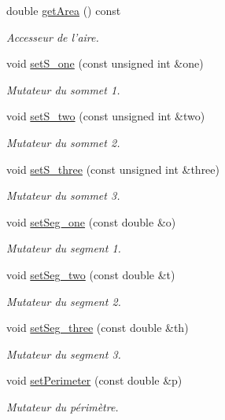 \begin{DoxyCompactItemize}
double \hyperlink{class_face_a58beb8ce1b9f8154379db998a02ffa3d}{get\-Area} () const 
\begin{DoxyCompactList}\small\item\em Accesseur de l'aire. \end{DoxyCompactList}\item 
void \hyperlink{class_face_a96639aea98e0c24899d892bec1d5f513}{set\-S\-\_\-one} (const unsigned int \&one)
\begin{DoxyCompactList}\small\item\em Mutateur du sommet 1. \end{DoxyCompactList}\item 
void \hyperlink{class_face_a7bd40f7c3c9592fd4cc3cbd898d6fe42}{set\-S\-\_\-two} (const unsigned int \&two)
\begin{DoxyCompactList}\small\item\em Mutateur du sommet 2. \end{DoxyCompactList}\item 
void \hyperlink{class_face_aa6b474b884d3f7f54b20e5fe45c8c33f}{set\-S\-\_\-three} (const unsigned int \&three)
\begin{DoxyCompactList}\small\item\em Mutateur du sommet 3. \end{DoxyCompactList}\item 
void \hyperlink{class_face_a467b326e9be6b5aac350c9b87a5ab14c}{set\-Seg\-\_\-one} (const double \&o)
\begin{DoxyCompactList}\small\item\em Mutateur du segment 1. \end{DoxyCompactList}\item 
void \hyperlink{class_face_a1eebfcfb41d87470d675ab8fb106585e}{set\-Seg\-\_\-two} (const double \&t)
\begin{DoxyCompactList}\small\item\em Mutateur du segment 2. \end{DoxyCompactList}\item 
void \hyperlink{class_face_acc1fc08e71b974483dc876adb43da487}{set\-Seg\-\_\-three} (const double \&th)
\begin{DoxyCompactList}\small\item\em Mutateur du segment 3. \end{DoxyCompactList}\item 
void \hyperlink{class_face_af2be08b9e991f22d85aa39901a353a53}{set\-Perimeter} (const double \&p)
\begin{DoxyCompactList}\small\item\em Mutateur du périmètre. \end{DoxyCompactList}\item 

\end{DoxyCompactItemize}
